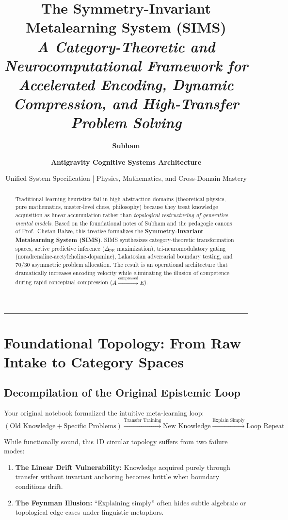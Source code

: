\documentclass[11pt,a4paper]{article}
\title{\vspace{-1.5cm}\textbf{\huge The Symmetry-Invariant Metalearning System (SIMS)}\\[0.3em]
\Large\textit{A Category-Theoretic and Neurocomputational Framework for Accelerated Encoding, Dynamic Compression, and High-Transfer Problem Solving}}
\author{\textbf{Subham} \and \textbf{Antigravity Cognitive Systems Architecture}}
\date{Unified System Specification | Physics, Mathematics, and Cross-Domain Mastery}
\begin{document}
\maketitle

\begin{abstract}
Traditional learning heuristics fail in high-abstraction domains (theoretical physics, pure mathematics, master-level chess, philosophy) because they treat knowledge acquisition as linear accumulation rather than \textit{topological restructuring of generative mental models}. Based on the foundational notes of Subham and the pedagogic canons of Prof.~Chetan Balwe, this treatise formalizes the \textbf{Symmetry-Invariant Metalearning System (SIMS)}. SIMS synthesizes category-theoretic transformation spaces, active predictive inference ($\Delta_{\text{PE}}$ maximization), tri-neuromodulatory gating (noradrenaline-acetylcholine-dopamine), Lakatosian adversarial boundary testing, and 70/30 asymmetric problem allocation. The result is an operational architecture that dramatically increases encoding velocity while eliminating the illusion of competence during rapid conceptual compression ($A \xrightarrow{\text{compressed}} E$).
\end{abstract}

\tableofcontents
\vspace{0.5cm}
\hrule
\vspace{0.8cm}

\section{Foundational Topology: From Raw Intake to Category Spaces}

\subsection{Decompilation of the Original Epistemic Loop}
Your original notebook formalized the intuitive meta-learning loop:
\begin{equation}
    \left(\text{Old Knowledge} + \text{Specific Problems}\right) \xrightarrow{\text{Transfer Training}} \text{New Knowledge} \xrightarrow{\text{Explain Simply}} \text{Loop Repeat}
\end{equation}

While functionally sound, this 1D circular topology suffers from two failure modes:
\begin{enumerate}[label=\textbf{(\alph*)}]
    \item \textbf{The Linear Drift Vulnerability:} Knowledge acquired purely through transfer without invariant anchoring becomes brittle when boundary conditions drift.
    \item \textbf{The Feynman Illusion:} ``Explaining simply'' often hides subtle algebraic or topological edge-cases under linguistic metaphors.
\end{enumerate}
\end{document}
